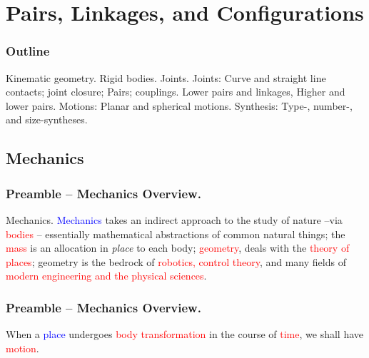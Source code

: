 \section{Pairs, Linkages, and Configurations}

\begin{frame}
	\frametitle{Outline}
	\begin{tcolorbox}[coltitle=white!80,colframe=blue!85,split=.2,title=Mechanism Components]
		Kinematic geometry. Rigid bodies. Joints.
		\tcblower
		Joints: Curve and straight line contacts; joint closure;
		\vspace{.2cm}
		\newline
		Pairs; couplings.
		\vspace{.2cm}
		\newline
		Lower pairs and linkages, Higher and lower pairs.
		\vspace{.2cm}
		\newline
		Motions: Planar and spherical motions.
		\vspace{.2cm}
		\newline
		Synthesis: Type-, number-, and size-syntheses.
	\end{tcolorbox}
\end{frame}

\subsection{Mechanics}
\begin{frame}
	\frametitle{Preamble -- Mechanics Overview.}
	\begin{block}{Mechanics.}
		\textcolor{blue}{Mechanics} takes an indirect approach to the study of nature --via \textcolor{red}{bodies} --  essentially mathematical abstractions of common natural things; the \textcolor{red}{mass} is an allocation in \textit{place} to each body; \textcolor{red}{geometry}, deals with the \textcolor{red}{theory of places}; geometry is the bedrock of \textcolor{red}{robotics, control theory}, and many fields of \textcolor{red}{modern engineering and the physical sciences}.
	\end{block}
\end{frame}

\begin{frame}
	\frametitle{Preamble -- Mechanics Overview.}
	\begin{definition}[Motion.]
		When a  \textcolor{blue}{place} undergoes \textcolor{red}{body transformation} in the course of  \textcolor{red}{time}, we shall have \textcolor{red}{motion}.
	\end{definition}
\end{frame}

